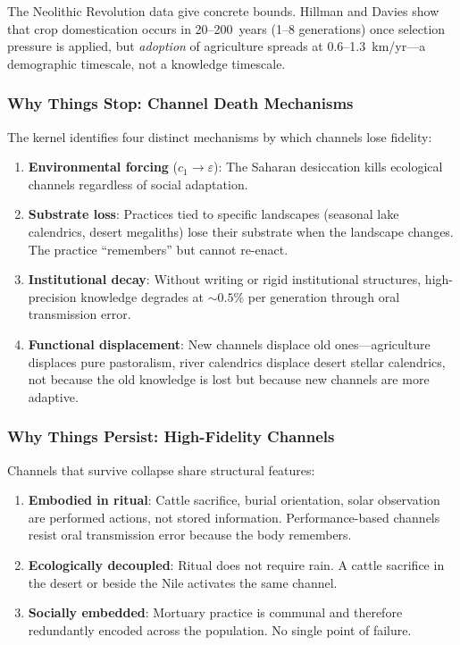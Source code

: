\documentclass[
  aps,
  prd,
  twocolumn,
  superscriptaddress,
  nofootinbib,
  floatfix
]{revtex4-2}
\newcommand{\eps}{\varepsilon}
\begin{document}
The Neolithic Revolution data give concrete bounds.
Hillman and Davies show that crop domestication occurs
in 20--200~years (1--8 generations) once selection
pressure is applied, but \emph{adoption} of
agriculture spreads at 0.6--1.3~km/yr---a demographic
timescale, not a knowledge timescale.

\subsubsection{Why Things Stop: Channel Death Mechanisms}

The kernel identifies four distinct mechanisms by
which channels lose fidelity:

\begin{enumerate}[leftmargin=*]
\item \textbf{Environmental forcing} ($c_1 \to \eps$):
The Saharan desiccation kills ecological
channels regardless of social adaptation.

\item \textbf{Substrate loss}: Practices tied to
specific landscapes (seasonal lake calendrics, desert
megaliths) lose their substrate when the landscape
changes.  The practice ``remembers'' but cannot
re-enact.

\item \textbf{Institutional decay}: Without writing
or rigid institutional structures, high-precision
knowledge degrades at $\sim\!0.5$\% per generation
through oral transmission error.

\item \textbf{Functional displacement}: New
channels displace old ones---agriculture displaces
pure pastoralism, river calendrics displace desert
stellar calendrics, not because the old knowledge is
lost but because new channels are more adaptive.
\end{enumerate}

\subsubsection{Why Things Persist: High-Fidelity
Channels}

Channels that survive collapse share structural
features:

\begin{enumerate}[leftmargin=*]
\item \textbf{Embodied in ritual}: Cattle sacrifice,
burial orientation, solar observation are
performed actions, not stored information.
Performance-based channels resist oral transmission
error because the body remembers.

\item \textbf{Ecologically decoupled}: Ritual does
not require rain.  A cattle sacrifice in the desert
or beside the Nile activates the same channel.

\item \textbf{Socially embedded}: Mortuary practice
is communal and therefore redundantly encoded across
the population.  No single point of failure.
\end{enumerate}
\end{document}
